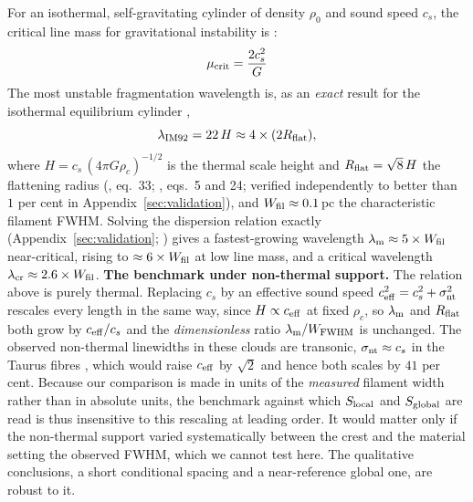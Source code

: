 \documentclass[usenatbib,twoside,twocolumn]{mnras}
\begin{document}
For an isothermal, self-gravitating cylinder of density $\rho_0$ and sound speed $c_s$, the critical line mass for gravitational instability is \citep{Ostriker1964}:
\begin{equation}
\mu_{\rm crit} = \frac{2c_s^2}{G}
\label{eq:mucrit}
\end{equation}
The most unstable fragmentation wavelength is, as an \emph{exact} result for the isothermal equilibrium cylinder \citep{Inutsuka1992},
\begin{equation}
\lambda_{\rm IM92} = 22\,H \approx 4\times(2R_{\rm flat}),
\label{eq:lambdam}
\end{equation}
where $H = c_s\,(4\pi G\rho_c)^{-1/2}$ is the thermal scale height and $R_{\rm flat}=\sqrt8\,H$ the flattening radius (\citealt{Nagasawa1987}, eq.~33; \citealt{Fischera2012}, eqs.~5 and 24; verified independently to better than $1$ per cent in Appendix~\ref{sec:validation}), and $W_{\rm fil}\approx0.1$\,pc the characteristic filament FWHM. Solving the dispersion relation exactly (Appendix~\ref{sec:validation}; \citealt{Fischera2012}) gives a fastest-growing wavelength $\lambda_{\rm m}\approx5\times W_{\rm fil}$ near-critical, rising to $\approx6\times W_{\rm fil}$ at low line mass, and a critical wavelength $\lambda_{\rm cr}\approx2.6\times W_{\rm fil}$. \smallskip\noindent\textbf{The benchmark under non-thermal support.} The relation above is purely thermal. Replacing $c_s$ by an effective sound speed $c_{\rm eff}^2=c_s^2+\sigma_{\rm nt}^2$ rescales every length in the same way, since $H\propto c_{\rm eff}$ at fixed $\rho_c$, so $\lambda_{\rm m}$ and $R_{\rm flat}$ both grow by $c_{\rm eff}/c_s$ and the \emph{dimensionless} ratio $\lambda_{\rm m}/W_{\rm FWHM}$ is unchanged. The observed non-thermal linewidths in these clouds are transonic, $\sigma_{\rm nt}\approx c_s$ in the Taurus fibres \citep{Hacar2013}, which would raise $c_{\rm eff}$ by $\sqrt2$ and hence both scales by $41$ per cent. Because our comparison is made in units of the \emph{measured} filament width rather than in absolute units, the benchmark against which $S_{\rm local}$ and $S_{\rm global}$ are read is thus insensitive to this rescaling at leading order. It would matter only if the non-thermal support varied systematically between the crest and the material setting the observed FWHM, which we cannot test here. The qualitative conclusions, a short conditional spacing and a near-reference global one, are robust to it.
\end{document}
